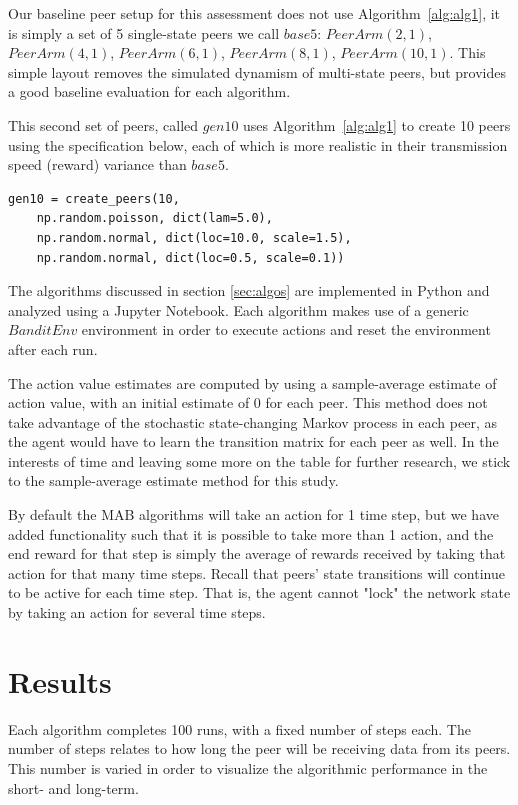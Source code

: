 \documentclass{article}
\begin{document}
Our baseline peer setup for this assessment does not use Algorithm~\ref{alg:alg1}, it is simply a set of 5 single-state peers we call $base5$: $PeerArm(2,1)$, $PeerArm(4,1)$, 
$PeerArm(6,1)$, $PeerArm(8,1)$, $PeerArm(10,1)$. This simple layout removes the simulated dynamism of multi-state peers, but provides a good baseline evaluation for 
each algorithm. 

This second set of peers, called $gen10$ uses Algorithm~\ref{alg:alg1} to create 10 peers using the specification below, each of which is more realistic in their transmission 
speed (reward) variance than $base5$.
\begin{lstlisting}
gen10 = create_peers(10, 
    np.random.poisson, dict(lam=5.0), 
    np.random.normal, dict(loc=10.0, scale=1.5), 
    np.random.normal, dict(loc=0.5, scale=0.1))
\end{lstlisting}

The algorithms discussed in section \ref{sec:algos} are implemented in Python and analyzed using a Jupyter Notebook. Each algorithm makes use of a generic $BanditEnv$ 
environment in order to execute actions and reset the environment after each run. 

The action value estimates are computed by using a sample-average estimate of action value, with an initial estimate of 0 for each peer. This method does not take 
advantage of the stochastic state-changing Markov process in each peer, as the agent would have to learn the transition matrix for each peer as well. In the interests of 
time and leaving some more on the table for further research, we stick to the sample-average estimate method for this study.

By default the MAB algorithms will take an action for 1 time step, but we have added functionality such that it is possible to take more than 1 action, and the end reward 
for that step is simply the average of rewards received by taking that action for that many time steps. Recall that peers' state transitions will continue to be active 
for each time step. That is, the agent cannot "lock" the network state by taking an action for several time steps. 

\section{Results}
Each algorithm completes 100 runs, with a fixed number of steps each. The number of steps relates to how long the peer will be receiving data from its peers. This number is 
varied in order to visualize the algorithmic performance in the short- and long-term. 
\end{document}

